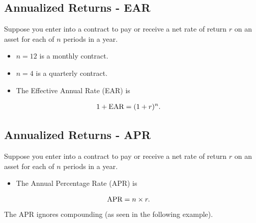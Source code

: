 \documentclass[letterpaper,10pt,english]{sphinxmanual}
\begin{document}
\subsection{Annualized Returns - EAR}
\label{returns:annualized-returns-ear}
Suppose you enter into a contract to pay or receive a net rate of
return $r$ on an asset for each of $n$ periods in a year.
\begin{itemize}
\item {} 
$n=12$  is a monthly contract.

\end{itemize}
\begin{itemize}
\item {} 
$n=4$ is a quarterly contract.

\end{itemize}
\begin{itemize}
\item {} 
The Effective Annual Rate (EAR) is

\end{itemize}
\begin{gather}
\begin{split}1 + \text{EAR} & = (1 + r)^n.\end{split}\notag
\end{gather}

\subsection{Annualized Returns - APR}
\label{returns:annualized-returns-apr}
Suppose you enter into a contract to pay or receive a net rate of
return $r$ on an asset for each of $n$ periods in a year.
\begin{itemize}
\item {} 
The Annual Percentage Rate (APR) is

\end{itemize}
\begin{gather}
\begin{split}\text{APR} & = n \times r.\end{split}\notag
\end{gather}
The APR ignores compounding (as seen in the following example).
\end{document}

